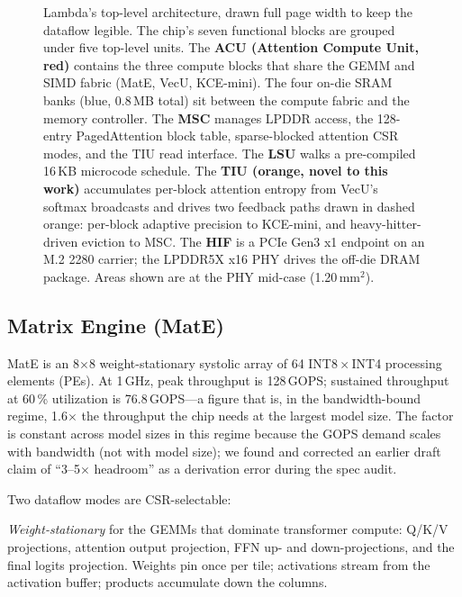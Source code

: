\documentclass[conference]{IEEEtran}
\begin{document}
\begin{figure}[t]
\caption{Lambda's top-level architecture, drawn full page width to keep the dataflow legible. The chip's seven functional blocks are grouped under five top-level units. The \textbf{ACU (Attention Compute Unit, red)} contains the three compute blocks that share the GEMM and SIMD fabric (MatE, VecU, KCE-mini). The four on-die SRAM banks (blue, 0.8\,MB total) sit between the compute fabric and the memory controller. The \textbf{MSC} manages LPDDR access, the 128-entry PagedAttention block table, sparse-blocked attention CSR modes, and the TIU read interface. The \textbf{LSU} walks a pre-compiled 16\,KB microcode schedule. The \textbf{TIU (orange, novel to this work)} accumulates per-block attention entropy from VecU's softmax broadcasts and drives two feedback paths drawn in dashed orange: per-block adaptive precision to KCE-mini, and heavy-hitter-driven eviction to MSC. The \textbf{HIF} is a PCIe Gen3 x1 endpoint on an M.2 2280 carrier; the LPDDR5X x16 PHY drives the off-die DRAM package. Areas shown are at the PHY mid-case (1.20\,mm$^2$).}
\label{fig:topology}
\end{figure}

\subsection{Matrix Engine (MatE)}

MatE is an 8$\times$8 weight-stationary systolic array of 64 INT8\,$\times$\,INT4 processing elements (PEs). At 1\,GHz, peak throughput is 128\,GOPS; sustained throughput at 60\,\% utilization is 76.8\,GOPS---a figure that is, in the bandwidth-bound regime, 1.6$\times$ the throughput the chip needs at the largest model size. The factor is constant across model sizes in this regime because the GOPS demand scales with bandwidth (not with model size); we found and corrected an earlier draft claim of ``3--5$\times$ headroom'' as a derivation error during the spec audit.

Two dataflow modes are CSR-selectable:

\textit{Weight-stationary} for the GEMMs that dominate transformer compute: Q/K/V projections, attention output projection, FFN up- and down-projections, and the final logits projection. Weights pin once per tile; activations stream from the activation buffer; products accumulate down the columns.
\end{document}
